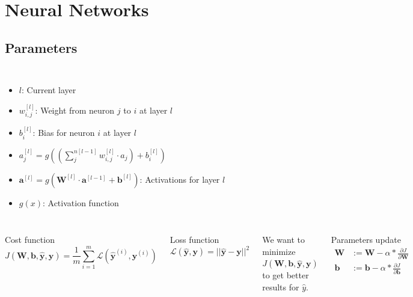 \documentclass[xcolor=x11names,compress]{beamer}
\begin{document}
\section{Neural Networks}
\begin{frame}{\secname}
	
\end{frame}
\subsection{Parameters}
\begin{frame}{\subsecname}
    \begin{columns}[t]
        \begin{itemize}
            \item $l$: Current layer
            \item $w_{i, j}^{[l]}$: Weight from neuron $j$ to $i$ at layer $l$
            \item $b_{i}^{[l]}$: Bias for neuron $i$ at layer $l$
            \item $a_{j}^{[l]} = g\left( \left( \sum_{j}^{n[l-1]}  w_{i, j}^{[l]} \cdot a_{j} \right) + b_i^{[l]} \right)$
            \item $\bm{a}^{[l]} = g(\bm{W}^{[l]}\cdot \bm{a}^{[l - 1]} + \bm{b}^{[l]})$: Activations for layer $l$
            \item $g(x)$: Activation function
        \end{itemize}
        \centering
        
    \end{columns}
\end{frame}
\begin{frame}
    \begin{columns}
        \begin{block}{Cost function}
            $$
            J(\bm{W}, \bm{b}, \hat{\bm{y}}, \bm{y}) = \frac{1}{m} \sum_{i=1}^{m} \mathcal{L}(\hat{\bm{y}}^{(i)}, \bm{y}^{(i)})
            $$
        \end{block}
        \begin{block}{Loss function}
            $$
            \mathcal{L}(\hat{\bm{y}}, \bm{y}) = ||\hat{\bm{y}} - \bm{y}||^2
            $$
        \end{block}
        We want to minimize $J(\bm{W}, \bm{b}, \hat{\bm{y}}, \bm{y})$ to get better results for $\hat{y}$.
        \begin{block}{Parameters update}
            \begin{align*}
                \bm{W} &:= \bm{W} - \alpha*\frac{\partial J}{\partial \bm{W}} \\
                \bm{b} &:= \bm{b} - \alpha*\frac{\partial J}{\partial \bm{b}}
            \end{align*}
        \end{block}
    \end{columns}
\end{frame}
\end{document}
